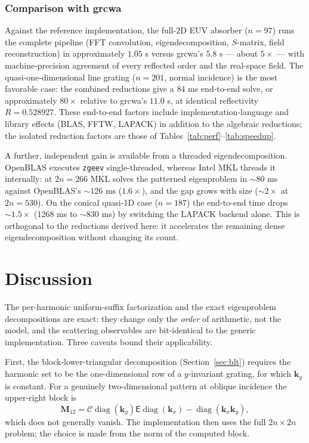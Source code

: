 \documentclass[11pt]{article}
\theoremstyle{remark}
\newcommand{\Cmat}{\mathcal{C}}
\newcommand{\epinv}{\mathsf{E}}
\newcommand{\kk}{\mathbf{k}}
\DeclareMathOperator{\diag}{diag}
\begin{document}
\subsubsection{Comparison with grcwa}

Against the reference implementation, the full-2D EUV absorber ($n=97$) runs
the complete pipeline (FFT convolution, eigendecomposition, $S$-matrix, field
reconstruction) in approximately $1.05$ s versus grcwa's $5.8$ s --- about
$5\times$ --- with machine-precision agreement of every reflected order and
the real-space field.  The quasi-one-dimensional line grating ($n=201$, normal
incidence) is the most favorable case: the combined reductions give a
$84$ ms end-to-end solve, or approximately $80\times$ relative to grcwa's
$11.0$ s, at identical reflectivity $R=0.528927$.  These end-to-end factors
include implementation-language and library effects (BLAS, FFTW, LAPACK) in
addition to the algebraic reductions; the isolated reduction factors are those
of Tables~\ref{tab:perf}--\ref{tab:speedup}.

A further, independent gain is available from a threaded eigendecomposition.
OpenBLAS executes \texttt{zgeev} single-threaded, whereas Intel MKL threads it
internally: at $2n=266$ MKL solves the patterned eigenproblem in $\sim80$ ms
against OpenBLAS's $\sim126$ ms ($1.6\times$), and the gap grows with size
($\sim2\times$ at $2n=530$).  On the conical quasi-1D case ($n=187$) the
end-to-end time drops $\sim1.5\times$ (1268 ms to $\sim$830 ms) by switching
the LAPACK backend alone.  This is orthogonal to the reductions derived here:
it accelerates the remaining dense eigendecomposition without changing its
count.

\section{Discussion}
\label{sec:disc}

The per-harmonic uniform-suffix factorization and the exact eigenproblem
decompositions are exact: they change only the \emph{order} of arithmetic, not
the model, and the scattering observables are bit-identical to the generic
implementation. Three caveats bound their applicability.

First, the block-lower-triangular decomposition
(Section~\ref{sec:blt}) requires the harmonic set to be the one-dimensional row
of a $y$-invariant grating, for which $\kk_y$ is constant.  For a genuinely
two-dimensional pattern at oblique incidence the upper-right block is
\begin{equation}
\mathbf{M}_{12}=\Cmat\diag(\kk_y)\epinv\diag(\kk_x)
-\diag(\kk_x\kk_y),
\end{equation}
which does not generally vanish.  The implementation then uses the full
$2n\times2n$ problem; the choice is made from the norm of the computed block.
\end{document}
